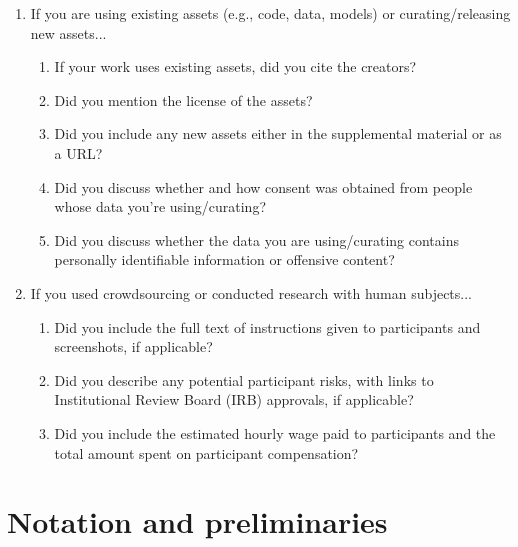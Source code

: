 \documentclass{article}
\numberwithin{equation}{section}
\newcommand{\1}{\mathbbm{1}}
\begin{document}
\begin{enumerate}
\item If you are using existing assets (e.g., code, data, models) or curating/releasing new assets...
\begin{enumerate}
  \item If your work uses existing assets, did you cite the creators?
    \answerNA{}
  \item Did you mention the license of the assets?
    \answerNA{}
  \item Did you include any new assets either in the supplemental material or as a URL?
    \answerNA{}
  \item Did you discuss whether and how consent was obtained from people whose data you're using/curating?
    \answerNA{}
  \item Did you discuss whether the data you are using/curating contains personally identifiable information or offensive content?
    \answerNA{}
\end{enumerate}


\item If you used crowdsourcing or conducted research with human subjects...
\begin{enumerate}
  \item Did you include the full text of instructions given to participants and screenshots, if applicable?
    \answerNA{}
  \item Did you describe any potential participant risks, with links to Institutional Review Board (IRB) approvals, if applicable?
    \answerNA{}
  \item Did you include the estimated hourly wage paid to participants and the total amount spent on participant compensation?
    \answerNA{}
\end{enumerate}


\end{enumerate}




\appendix


\newpage
\section{Notation and preliminaries}\label{app:preliminaries}
\end{document}
